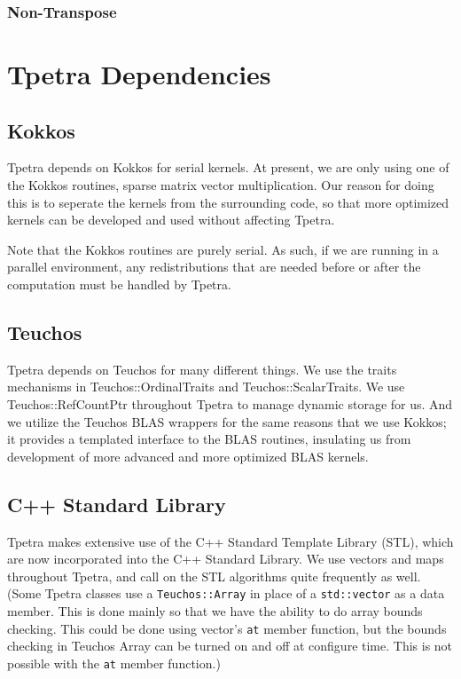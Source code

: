 \documentclass[10pt,relax]{TpetraDesign}
\begin{document}
\subsubsection{Non-Transpose}

\section{Tpetra Dependencies}

\subsection{Kokkos}
Tpetra depends on Kokkos\cite{Kokkos} for serial kernels. At present, we are only using one of the Kokkos routines, sparse matrix vector multiplication. Our reason for doing this is to seperate the kernels from the surrounding code, so that more optimized kernels can be developed and used without affecting Tpetra.

Note that the Kokkos routines are purely serial. As such, if we are running in a parallel environment, any redistributions that are needed before or after the computation must be handled by Tpetra.

\subsection{Teuchos}
Tpetra depends on Teuchos\cite{Teuchos} for many different things. We use the traits mechanisms in Teuchos::OrdinalTraits and Teuchos::ScalarTraits. We use Teuchos::RefCountPtr throughout Tpetra to manage dynamic storage for us. And we utilize the Teuchos BLAS wrappers for the same reasons that we use Kokkos; it provides a templated interface to the BLAS routines, insulating us from development of more advanced and more optimized BLAS kernels.

\subsection{C++ Standard Library}
Tpetra makes extensive use of the C++ Standard Template Library (STL), which are now incorporated into the C++ Standard Library. We use vectors and maps throughout Tpetra, and call on the STL algorithms quite frequently as well. (Some Tpetra classes use a \texttt{Teuchos::Array} in place of a \texttt{std::vector} as a data member. This is done mainly so that we have the ability to do array bounds checking. This could be done using vector's \texttt{at} member function, but the bounds checking in Teuchos Array can be turned on and off at configure time. This is not possible with the \texttt{at} member function.)

%
\clearpage


\end{document}
